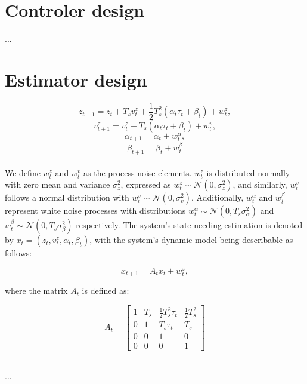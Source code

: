\documentclass{article}
\begin{document}
\section{Controler design}
...
\section{Estimator design}

\begin{equation}
    z_{t+1} = z_t + T_s v_t^z + \frac{1}{2} T_s^2 (\alpha_t \tau_t + \beta_t) + w_t^z,
\end{equation}
\begin{equation}
    v_{t+1}^z = v_t^z + T_s (\alpha_t \tau_t + \beta_t) + w_t^v,
\end{equation}
\begin{equation}
    \alpha_{t+1} = \alpha_t + w_t^\alpha,
\end{equation}
\begin{equation}
    \beta_{t+1} = \beta_t + w_t^\beta
\end{equation}
\\

\noindent
We define $w_t^z$ and $w_t^v$ as the process noise elements.
$w_t^z$ is distributed normally with zero mean and variance
$\sigma_z^2$, expressed as $w_t^z \sim \mathcal{N}(0, \sigma_z^2)$, 
and similarly, $w_t^v$ follows a normal distribution with $w_t^v \sim \mathcal{N}(0, \sigma_v^2)$.
Additionally, $w_t^\alpha$ and $w_t^\beta$ represent white noise processes with distributions
$w_t^\alpha \sim \mathcal{N}(0, T_s \sigma_\alpha^2)$ and $w_t^\beta \sim \mathcal{N}(0, T_s \sigma_\beta^2)$ 
respectively. The system's state needing estimation is denoted by $x_t = (z_t, v_t^z, \alpha_t, \beta_t)$, 
with the system's dynamic model being describable as follows:

\[
x_{t+1} = A_t x_t + w_t^z,
\]

where the matrix $A_t$ is defined as:

\[
A_t = \begin{bmatrix}
1 & T_s & \frac{1}{2} T_s^2 \tau_t & \frac{1}{2} T_s^2 \\
0 & 1 & T_s \tau_t & T_s \\
0 & 0 & 1 & 0 \\
0 & 0 & 0 & 1
\end{bmatrix}
\]

\\

\noindent
...
\end{document}

